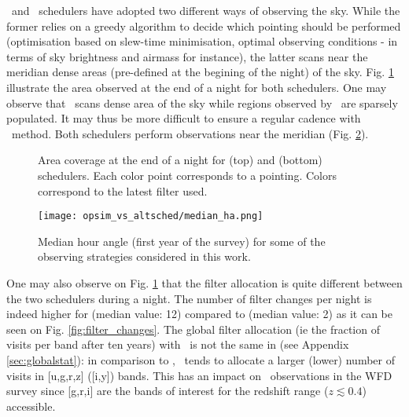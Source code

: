 \opsim~and \altsched~schedulers have adopted two different ways of observing the sky. While the former relies on a greedy algorithm to decide which pointing should be performed (optimisation based on slew-time minimisation, optimal observing conditions - in terms of sky brightness and airmass for instance), the latter scans near the meridian dense areas (pre-defined at the begining of the night) of the sky. Fig. \ref{fig:night_comp} illustrate the area observed at the end of a night for both schedulers. One may observe that \altsched~scans dense area of the sky while regions observed by \opsim~are sparsely populated. It may thus be more difficult to ensure a regular cadence with \opsim~method. Both schedulers perform observations near the meridian (Fig. \ref{fig:scan_meridian}).

\begin{figure}[!htbp]
  \centering
  \caption{Area coverage at the end of a night for \opsim(top) and \altsched(bottom) schedulers.  Each color point corresponds to a pointing. Colors correspond to the latest filter used.}\label{fig:night_comp}
\end{figure}

\begin{figure}[!htbp]
  \begin{center}
    \texttt{[image: opsim\_vs\_altsched/median\_ha.png]}
    \caption{Median hour angle (first year of the survey) for some of the observing strategies considered in this work.}\label{fig:scan_meridian}
    \end{center}
\end{figure}

One may also observe on Fig. \ref{fig:night_comp} that the filter allocation is quite different between the two schedulers during a night. The number of filter changes per night is indeed higher for \altsched(median value: 12) compared to \opsim(median value: 2) as it can be seen on Fig. \ref{fig:filter_changes}. The global filter allocation (ie the fraction of visits per band after ten years) with \altsched~is not the same in \opsim (see Appendix \ref{sec:globalstat}): in comparison to \opsim, \altsched~tends to allocate a larger (lower)  number of visits in [u,g,r,z] ([i,y]) bands. This has an impact on \sne~observations in the WFD survey since [g,r,i] are the bands of interest for the redshift range ($z \lesssim 0.4$) accessible.

